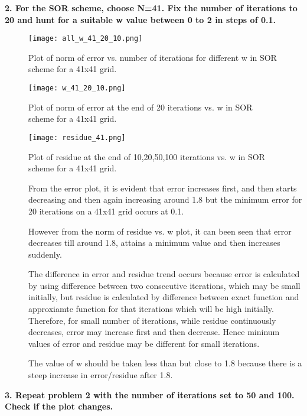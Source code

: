 \documentclass{article}
\begin{document}
\newpage
\textbf{2. For the SOR scheme, choose N=41. Fix the number of iterations to 20 and hunt for a suitable w value between 0 to 2 in steps of 0.1.}
\begin{figure}[H] \label{figure}
\texttt{[image: all\_w\_41\_20\_10.png]}
\caption{Plot of norm of error vs. number of iterations for different w in SOR scheme for a 41x41 grid.}
\label{figure:}
\end{figure}

\begin{figure}[H] \label{figure}
\texttt{[image: w\_41\_20\_10.png]}
\caption{Plot of norm of error at the end of 20 iterations vs. w in SOR scheme for a 41x41 grid.}
\label{figure:}
\end{figure}

\begin{figure}[H] \label{figure}
\texttt{[image: residue\_41.png]}
\caption{Plot of residue at the end of 10,20,50,100 iterations vs. w in SOR scheme for a 41x41 grid.}
\label{figure:}
\end{figure}

\begin{description}
\item[]From the error plot, it is evident that error increases first, and then starts decreasing and then again increasing around 1.8 but the minimum error for 20 iterations on a 41x41 grid occurs at 0.1.
\item[]However from the norm of residue vs. w plot, it can been seen that error decreases till around 1.8, attains a minimum value and then increases suddenly.
\item[]The difference in error and residue trend occurs because error is calculated by using difference between two consecutive iterations, which may be small initially, but residue is calculated by difference between exact function and approxiamte function for that iterations which will be high initially. Therefore, for small number of iterations, while residue continuously decreases, error may increase first and then decrease. Hence mininum values of error and residue may be different for small iterations.
\item[]The value of w should be taken less than but close to 1.8 because there is a steep increase in error/residue after 1.8.
\end{description}

\newpage
\textbf{3. Repeat problem 2 with the number of iterations set to 50 and 100.  Check if the plot changes.}
\end{document}
